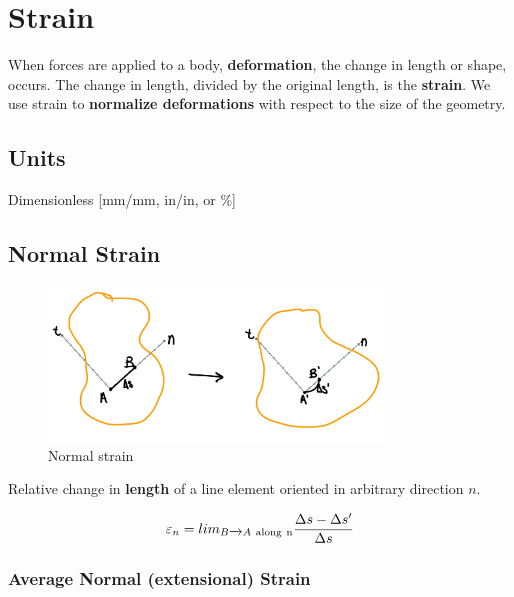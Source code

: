 \section{Strain}

When forces are applied to a body, \textbf{deformation}, the change in length or shape, occurs. The change in length, divided by the original length, is the \textbf{strain}. We use strain to \textbf{normalize deformations} with respect to the size of the geometry.

\subsection{Units}

Dimensionless [mm/mm, in/in, or \%]

\subsection{Normal Strain}

\begin{figure}[!h]
\centering
\includegraphics[angle=0, width=3.5in]{Strain-Figures/Normal Strain.png}
\vspace{-2mm}
\caption{\small Normal strain}
\vspace{-3mm}
\label{Fig:Normal Strain}
\end{figure}

Relative change in \textbf{length} of a line element oriented in arbitrary direction $n$.

\[ \varepsilon_n = lim_{B  \xrightarrow{} A \rm\ along \rm\ n} \frac{\Delta s - \Delta s'}{\Delta s} \]


\subsubsection{Average Normal (extensional) Strain}

